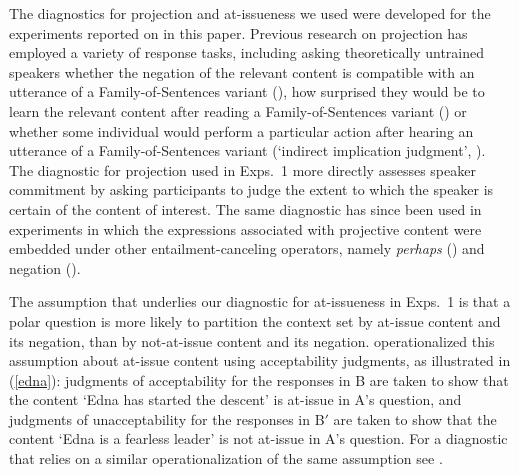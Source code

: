 \documentclass[11pt,fleqn]{article}
\newcommand{\6}{\mbox{$[\hspace*{-.6mm}[$}}
\newcommand{\9}{\mbox{$]\hspace*{-.6mm}]$}}
\begin{document}
The diagnostics for projection and at-issueness we used were developed for the experiments reported on in this paper. Previous research on projection has employed a variety of response tasks, including asking theoretically untrained speakers whether the negation of the relevant content is compatible with an utterance of a Family-of-Sentences variant (\citealt{xue-onea11}), how surprised they would be to learn the relevant content after reading a Family-of-Sentences variant (\citealt{smith-hall11}) or whether some individual would perform a particular action after hearing an utterance of a Family-of-Sentences variant (`indirect implication judgment', \citealt{brst-lang11}). The diagnostic for projection used in Exps.~1 more directly assesses speaker commitment by asking participants to judge the extent to which the speaker is certain of the content of interest. The same diagnostic has since been used in experiments in which the expressions associated with projective content were embedded under other entailment-canceling operators, namely {\em perhaps} (\citealt{tonhauser-salt26}) and negation (\citealt*{stevens-etal2017}).

The assumption that underlies our diagnostic for at-issueness in Exps.~1 is that a polar question is more likely to partition the context set by at-issue content and its negation, than by not-at-issue content and its negation. \citet{amaral-etal07} operationalized this assumption about at-issue content using acceptability judgments, as illustrated in (\ref{edna}): judgments of acceptability for the responses in B are taken to show that the content `Edna has started the descent' is at-issue in A's question, and judgments of unacceptability for the responses in B$'$ are taken to show that the content `Edna is a fearless leader' is not at-issue in A's question.  For a diagnostic that relies on a similar operationalization of the same assumption see \citealt{tonhauser-sula6}. 
\end{document}
